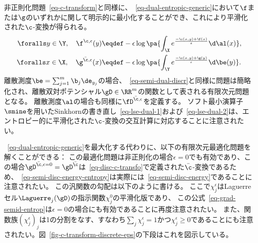 非正則化問題~\eqref{eq-c-transform}と同様に、~\eqref{eq-dual-entropic-generic}において$\f$または$\g$のいずれかに関して明示的に最小化することができ、これにより平滑化された$\c$-変換が得られる。
\begin{align*}
	\foralls y \in \Y, \quad
	\f^{\c,\epsilon}(y) &\eqdef - \epsilon \log\pa{
			\int_{\X} e^{\frac{-\c(x,y) + \f(x)}{\epsilon}} \d\al(x)
	},\\
	\foralls x \in \X, \quad
	\g^{\bar\c,\epsilon}(x) &\eqdef - \epsilon \log\pa{
			\int_{\Y} e^{\frac{-\c(x,y) + \g(y)}{\epsilon}} \d\be(y)
	}.
\end{align*}
離散測度$\be = \sum_{j=1}^m \b_j\de_{y_j}$の場合、~\eqref{eq-semi-dual-discr}と同様に問題は簡略化され、離散双対ポテンシャル$\gD \in \RR^m$の関数として表される有限次元問題となる。
離散測度$\al$の場合も同様に$\fD^{\bar\c,\epsilon}$を定義する。
%
ソフト最小演算子$\smine$を用いたSinkhornの書き直し~\eqref{eq-lse-dual-1}および~\eqref{eq-lse-dual-2}は、エントロピー的に平滑化された$\c$-変換の交互計算に対応することに注意されたい。

~\eqref{eq-dual-entropic-generic}を最大化する代わりに、以下の有限次元最適化問題を解くことができる：
この最適化問題は非正則化の場合$\epsilon=0$でも有効であり、この場合$\gD^{\bar\c,\epsilon=0}=\gD^{\bar\c}$は~\eqref{eq-disc-c-transfo}で定義された$\bar \c$-変換であるため、~\eqref{eq-semi-disc-energy-entropy}は実際には~\eqref{eq-semi-disc-energy}であることに注意されたい。
%
この汎関数の勾配は以下のように書ける。
ここで$\chi_j^\epsilon$はLaguerreセル$\Laguerre_{j}(\gD)$の指示関数$\chi_j^0$の平滑化版であり、
この公式~\eqref{eq-grad-semid-entrop}は$\epsilon=0$の場合にも有効であることに再度注意されたい。
%
また、関数族$( \chi_j^\epsilon )_j$は1の分割をなす、すなわち$\sum_j \chi_j^\epsilon=1$かつ$\chi_j^\epsilon \geq 0$であることにも注意されたい。図~\ref{fig-c-transform-discrete-eps}の下段はこれを図示している。

